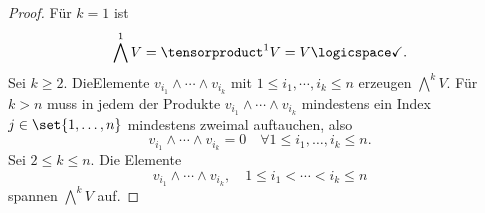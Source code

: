 \begin{proof}
  Für \( k=1 \) ist
  \begin{equation*}
    \bigwedge^1 V=\tensorproduct^1 V=V\logicspace \checkmark.
  \end{equation*}
  Sei \( k\geq 2 \). DieElemente \( v_{i_1}\wedge\dotsb\wedge v_{i_k} \) mit \( 1\leq i_1,\dotsb,i_k\leq n \) erzeugen \( \bigwedge^k V \). Für \( k>n \) muss in jedem der Produkte \( v_{i_1}\wedge \dotsb \wedge v_{i_k} \) mindestens ein Index \( j\in \set{1,\dotsc, n} \) mindestens zweimal auftauchen, also
  \begin{equation*}
    v_{i_1}\wedge\dotsb\wedge v_{i_k}=0\quad \forall 1\leq i_1,\dotsc,i_k\leq n.
  \end{equation*}
  Sei \( 2\leq k \leq n\). Die Elemente
  \begin{equation*}
    v_{i_1}\wedge \dotsb \wedge v_{i_k},\quad 1\leq i_1<\dotsb<i_k\leq n
  \end{equation*}
  spannen \( \bigwedge^k V \) auf. 
  

\end{proof}
